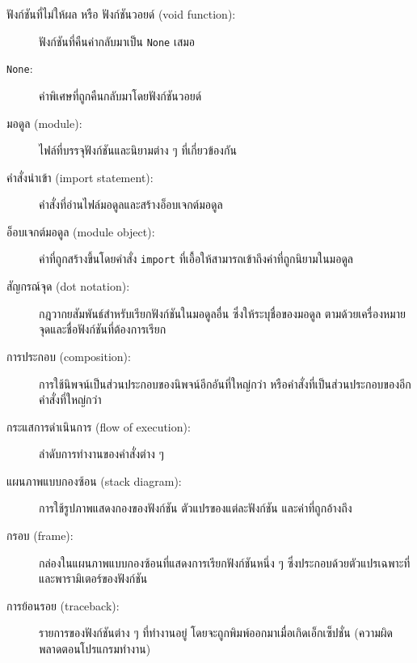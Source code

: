 \begin{description}
\item[ฟังก์ชันที่ไม่ให้ผล หรือ ฟังก์ชันวอยด์ (void function):] ฟังก์ชันที่คืนค่ากลับมาเป็น {\tt None} เสมอ


\item[{\tt None}:] ค่าพิเศษที่ถูกคืนกลับมาโดยฟังก์ชันวอยด์

\item[มอดูล (module):] ไฟล์ที่บรรจุฟังก์ชันและนิยามต่าง ๆ ที่เกี่ยวข้องกัน 

\item[คำสั่งนำเข้า (import statement):] คำสั่งที่อ่านไฟล์มอดูลและสร้างอ็อบเจกต์มอดูล

\item[อ็อบเจกต์มอดูล (module object):] ค่าที่ถูกสร้างขึ้นโดยคำสั่ง {\tt import} 
ที่เอื้อให้สามารถเข้าถึงค่าที่ถูกนิยามในมอดูล

\item[สัญกรณ์จุด (dot notation):]  กฎวากยสัมพันธ์สำหรับเรียกฟังก์ชันในมอดูลอื่น ซึ่งให้ระบุชื่อของมอดูล
ตามด้วยเครื่องหมายจุดและชื่อฟังก์ชันที่ต้องการเรียก 

\item[การประกอบ (composition):] การใช้นิพจน์เป็นส่วนประกอบของนิพจน์อีกอันที่ใหญ่กว่า 
หรือคำสั่งที่เป็นส่วนประกอบของอีกคำสั่งที่ใหญ่กว่า

\item[กระแสการดำเนินการ (flow of execution):]  ลำดับการทำงานของคำสั่งต่าง ๆ

\item[แผนภาพแบบกองซ้อน (stack diagram):]  การใช้รูปภาพแสดงกองของฟังก์ชัน ตัวแปรของแต่ละฟังก์ชัน 
และค่าที่ถูกอ้างถึง

\item[กรอบ (frame):]  กล่องในแผนภาพแบบกองซ้อนที่แสดงการเรียกฟังก์ชันหนึ่ง ๆ ซึ่งประกอบด้วยตัวแปรเฉพาะที่
และพารามิเตอร์ของฟังก์ชัน

\item[การย้อนรอย (traceback):]  รายการของฟังก์ชันต่าง ๆ ที่ทำงานอยู่ โดยจะถูกพิมพ์ออกมาเมื่อเกิดเอ็กเซ็ปชั่น
(ความผิดพลาดตอนโปรแกรมทำงาน)


\end{description}


